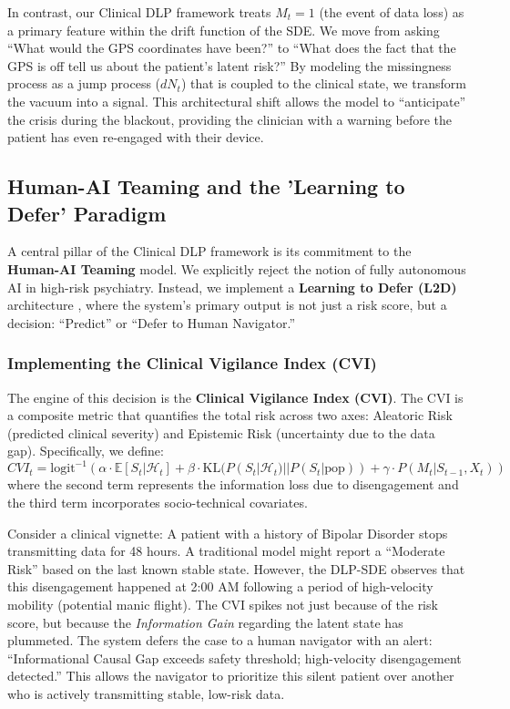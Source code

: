 In contrast, our Clinical DLP framework treats $M_t = 1$ (the event of data loss) as a primary feature within the drift function of the SDE. We move from asking ``What would the GPS coordinates have been?'' to ``What does the fact that the GPS is off tell us about the patient's latent risk?'' By modeling the missingness process as a jump process ($dN_t$) that is coupled to the clinical state, we transform the vacuum into a signal. This architectural shift allows the model to ``anticipate'' the crisis during the blackout, providing the clinician with a warning before the patient has even re-engaged with their device.

\subsection{Human-AI Teaming and the 'Learning to Defer' Paradigm}
A central pillar of the Clinical DLP framework is its commitment to the \textbf{Human-AI Teaming} model. We explicitly reject the notion of fully autonomous AI in high-risk psychiatry. Instead, we implement a \textbf{Learning to Defer (L2D)} architecture \cite{joshi2021learning, mozannar2020consistent}, where the system's primary output is not just a risk score, but a decision: ``Predict'' or ``Defer to Human Navigator.''

\subsubsection{Implementing the Clinical Vigilance Index (CVI)}
The engine of this decision is the \textbf{Clinical Vigilance Index (CVI)}. The CVI is a composite metric that quantifies the total risk across two axes: Aleatoric Risk (predicted clinical severity) and Epistemic Risk (uncertainty due to the data gap). Specifically, we define:
\begin{equation}
    CVI_t = \text{logit}^{-1} \left( \alpha \cdot \mathbb{E}[S_t | \mathcal{H}_t] + \beta \cdot \text{KL}(P(S_t | \mathcal{H}_t) || P(S_{t} | \text{pop})) + \gamma \cdot P(M_t | S_{t-1}, X_t) \right)
\end{equation}
where the second term represents the information loss due to disengagement and the third term incorporates socio-technical covariates.

Consider a clinical vignette: A patient with a history of Bipolar Disorder stops transmitting data for 48 hours. A traditional model might report a ``Moderate Risk'' based on the last known stable state. However, the DLP-SDE observes that this disengagement happened at 2:00 AM following a period of high-velocity mobility (potential manic flight). The CVI spikes not just because of the risk score, but because the \textit{Information Gain} regarding the latent state has plummeted. The system defers the case to a human navigator with an alert: ``Informational Causal Gap exceeds safety threshold; high-velocity disengagement detected.'' This allows the navigator to prioritize this silent patient over another who is actively transmitting stable, low-risk data.

